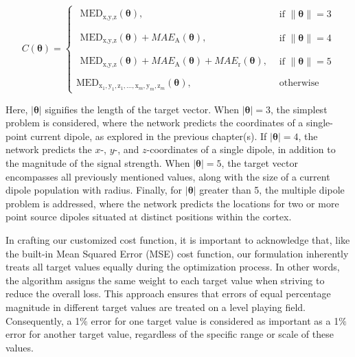 \documentclass[a4paper, UKenglish, 11pt]{uiomaster}
\begin{document}
\begin{equation}
    C(\boldsymbol{\theta}) =
    \begin{cases}
      \begin{array}{l}
      \text{MED}_{\text{x,y,z}}(\boldsymbol{\theta}),
      \end{array} & \text{if } \| \boldsymbol{\theta} \| = 3\\
      \\
      \begin{array}{l}
      \text{MED}_{\text{x,y,z}}(\boldsymbol{\theta}) + MAE_{\text{A}}(\boldsymbol{\theta}),
      \end{array} & \text{if } \| \boldsymbol{\theta} \| = 4\\
      \\
      \begin{array}{l}
      \text{MED}_{\text{x,y,z}}(\boldsymbol{\theta}) + MAE_{\text{A}}(\boldsymbol{\theta}) + MAE_{\text{r}}(\boldsymbol{\theta}),
      \end{array} & \text{if } \| \boldsymbol{\theta} \| = 5\\
      \\
      \text{MED}_{\text{x}_1,\text{y}_1,\text{z}_1,\ldots,\text{x}_m,\text{y}_m,\text{z}_m}(\boldsymbol{\theta}), & \text{otherwise}
    \end{cases}
    \label{eq:cost_function}
\end{equation}

Here, $| \boldsymbol{\theta} |$ signifies the length of the target vector. When $| \boldsymbol{\theta} | = 3$, the simplest problem is considered, where the network predicts the coordinates of a single-point current dipole, as explored in the previous chapter(s). If $| \boldsymbol{\theta} | = 4$, the network predicts the $x$-, $y$-, and $z$-coordinates of a single dipole, in addition to the magnitude of the signal strength. When $| \boldsymbol{\theta} | = 5$, the target vector encompasses all previously mentioned values, along with the size of a current dipole population with radius. Finally, for $| \boldsymbol{\theta} |$ greater than 5, the multiple dipole problem is addressed, where the network predicts the locations for two or more point source dipoles situated at distinct positions within the cortex.

In crafting our customized cost function, it is important to acknowledge that, like the built-in Mean Squared Error (MSE) cost function, our formulation inherently treats all target values equally during the optimization process. In other words, the algorithm assigns the same weight to each target value when striving to reduce the overall loss. This approach ensures that errors of equal percentage magnitude in different target values are treated on a level playing field. Consequently, a 1$\%$ error for one target value is considered as important as a 1$\%$ error for another target value, regardless of the specific range or scale of these values.
\end{document}
